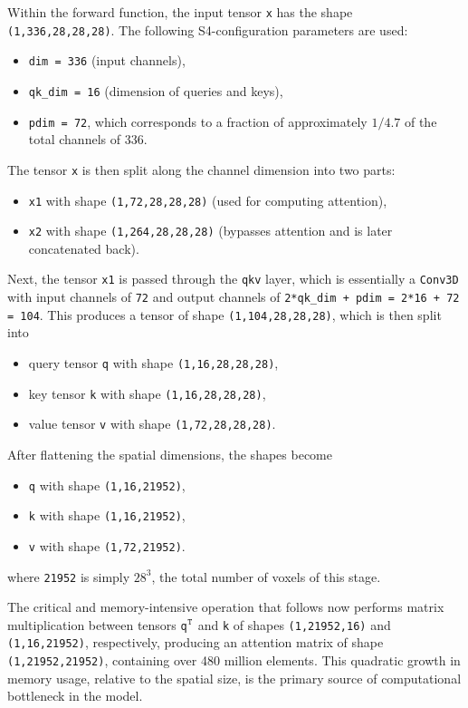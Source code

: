 \medskip

Within the forward function, the input tensor {\tt x} has the shape {\tt (1,336,28,28,28)}. The following S4-configuration parameters are used:
\begin{itemize}
	\item {\tt dim = 336} (input channels),
	\item {\tt qk\_dim = 16} (dimension of queries and keys),
	\item {\tt pdim = 72}, which corresponds to a fraction of approximately ${1}/{4.7}$ of the total channels of {336}.
\end{itemize}

\noindent The tensor {\tt x} is then split along the channel dimension into two parts:
\begin{itemize}
	\item {\tt x1} with shape {\tt (1,72,28,28,28)} (used for computing attention),
	\item {\tt x2} with shape {\tt (1,264,28,28,28)} (bypasses attention and is later concatenated back).
\end{itemize}
Next, the tensor {\tt x1} is passed through the {\tt qkv} layer, which is essentially a {\tt Conv3D} with input channels of {\tt 72} and output channels of {\tt 2*qk\_dim + pdim = 2*16 + 72 = 104}. This produces a tensor of shape {\tt (1,104,28,28,28)}, which is then split into
\begin{itemize}
	\item query tensor {\tt q} with shape {\tt (1,16,28,28,28)},
	\item key tensor {\tt k} with shape {\tt (1,16,28,28,28)},
	\item value tensor {\tt v} with shape {\tt (1,72,28,28,28)}.
\end{itemize}
After flattening the spatial dimensions, the shapes become
\begin{itemize}
	\item {\tt q} with shape {\tt (1,16,21952)},
	\item {\tt k} with shape {\tt (1,16,21952)},
	\item {\tt v} with shape {\tt (1,72,21952)}.
\end{itemize}
where {\tt 21952} is simply $28^3$, the total number of voxels of this stage.

\medskip

The critical and memory-intensive operation that follows now performs matrix multiplication between tensors {\tt q$^{\text{\tt T}}$} and {\tt k} of shapes {\tt (1,21952,16)} and {\tt (1,16,21952)}, respectively, producing an attention matrix of shape {\tt (1,21952,21952)}, containing over 480 million elements. This quadratic growth in memory usage, relative to the spatial size, is the primary source of computational bottleneck in the model.

